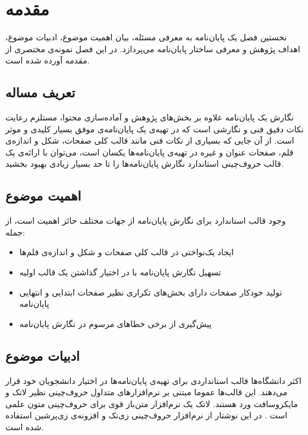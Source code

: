 
\chapter{مقدمه}
نخستین فصل یک پایان‌نامه به معرفی مسئله، بیان اهمیت موضوع، ادبیات موضوع، اهداف پژوهش و معرفی ساختار پایان‌نامه می‌پردازد. در این فصل نمونه‌ی مختصری از مقدمه آورده شده است.


\section{تعریف مساله}
نگارش یک پایان‌نامه‌ علاوه بر بخش‌های پژوهش و آماده‌سازی محتوا، مستلزم رعایت نکات دقیق فنی و نگارشی است که در تهیه‌ی یک پایان‌نامه‌ی موفق بسیار کلیدی و موثر است. از آن جایی که بسیاری از نکات فنی مانند قالب کلی صفحات، شکل و اندازه‌ی قلم، صفحات عنوان و غیره در تهیه‌ی پایان‌نامه‌ها یکسان است، می‌توان با ارائه‌ی یک قالب حروف‌چینی استاندارد نگارش پایان‌نامه‌ها را تا حد بسیار زیادی بهبود بخشید.


\section{اهمیت موضوع}
وجود قالب استاندارد برای نگارش پایان‌نامه از جهات مختلف حائز اهمیت است، از جمله:

\begin{itemize}
\item
ایجاد یک‌نواختی در قالب کلی صفحات و شکل و اندازه‌ی قلم‌ها
\item
تسهیل نگارش پایان‌نامه با در اختیار گذاشتن یک قالب اولیه
\item
تولید خودکار صفحات دارای بخش‌های تکراری نظیر صفحات ابتدایی و انتهایی پایان‌نامه
\item
پیش‌گیری از برخی خطاهای مرسوم در نگارش پایان‌نامه
\end{itemize}


\section{ادبیات موضوع}
اکثر دانشگاه‌ها قالب استانداردی برای تهیه‌ی پایان‌نامه‌ها در اختیار دانشجویان خود قرار می‌دهند. این قالب‌ها عموما مبتنی بر نرم‌افزارهای متداول حروف‌چینی نظیر لاتک و مایکروسافت ورد هستند. لاتک یک نرم‌افزار متن‌باز قوی برای حروف‌چینی متون علمی است \cite{knuth1984texbook, lamport1985LaTeX}. در این نوشتار از نرم‌افزار حروف‌چینی زی‌تک و افزونه‌ی زی‌پرشین استفاده شده است.


